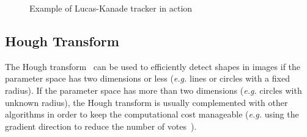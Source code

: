 \documentclass[12pt,a4paper,oneside,openright]{book}
\newcommand{\eg}{\emph{e.g.} }
\begin{document}
\begin{CJK}{UTF8}{}
\begin{figure}[htbp]
\begin{center}
    \caption{Example of Lucas-Kanade tracker in action\label{fig:lucas4}}
  \end{center}
\end{figure}

\subsection{Hough Transform}\label{cha:hough}
The Hough transform~\citep{duda1972use} can be used to efficiently detect shapes in images if the parameter space has two dimensions or less (\eg lines or circles with a fixed radius). If the parameter space has more than two dimensions (\eg circles with unknown radius), the Hough transform is usually complemented with other algorithms in order to keep the computational cost manageable (\eg using the gradient direction to reduce the number of votes~\citep{RefWorks:516}).


\end{CJK}
\end{document}
